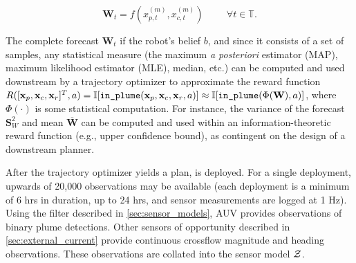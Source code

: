 \begin{equation}
    \mathbf{W}_t = f(x_{p,t}^{(m)}, x_{c,t}^{(m)}) \hspace{1cm} \forall t \in \mathbb{T}.
\end{equation}

The complete forecast $\mathbf{W}_t$ if the robot's belief $b$, and since it consists of a set of samples, any statistical measure (the maximum \emph{a posteriori} estimator (MAP), maximum likelihood estimator (MLE), median, etc.) can be computed and used downstream by a trajectory optimizer to approximate the reward function $R([\x_p, \x_c, \x_r]^T, a) = \indic{\texttt{in\_plume}(\x_p, \x_c, \x_r, a)} \approx \indic{\texttt{in\_plume}(\Phi(\mathbf{W}), a)}$, where $\Phi(\cdot)$ is some statistical computation. For instance, the variance of the forecast $\mathbf{S}^2_W$ and mean $\overbar{\mathbf{W}}$ can be computed and used within an information-theoretic reward function (e.g., upper confidence bound), as contingent on the design of a downstream planner. 

After the trajectory optimizer yields a plan, \Sentry is deployed. For a single deployment, upwards of 20,000 observations may be available (each deployment is a minimum of 6 hrs in duration, up to 24 hrs, and sensor measurements are logged at 1 Hz). Using the filter described in \cref{sec:sensor_models}, AUV \Sentry provides observations of binary plume detections. Other sensors of opportunity described in \cref{sec:external_current} provide continuous crossflow magnitude and heading observations. These observations are collated into the sensor model $\mathcal{Z}$.

